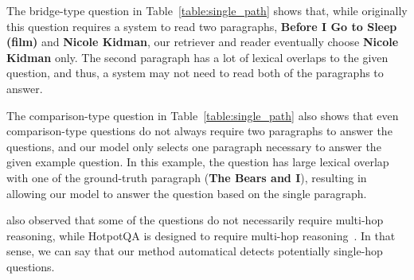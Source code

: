 The bridge-type question in Table~\ref{table:single_path} shows that, while originally this question requires a system to read two paragraphs, {\bf Before I Go to Sleep (film)} and {\bf Nicole Kidman}, our retriever and reader eventually choose {\bf Nicole Kidman} only.
The second paragraph has a lot of lexical overlaps to the given question, and thus, a system may not need to read both of the paragraphs to answer.

The comparison-type question in Table~\ref{table:single_path} also shows that even comparison-type questions do not always require two paragraphs to answer the questions, and our model only selects one paragraph necessary to answer the given example question.
In this example, the question has large lexical overlap with one of the ground-truth paragraph ({\bf The Bears and I}), resulting in allowing our model to answer the question based on the single paragraph.

\cite{min2019compositional} also observed that some of the questions do not necessarily require multi-hop reasoning, while HotpotQA is designed to require multi-hop reasoning~\citep{yang-etal-2018-hotpotqa}.
In that sense, we can say that our method automatical detects potentially single-hop questions.

